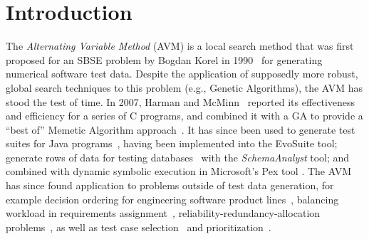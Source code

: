 \documentclass{llncs}
\newcommand{\AVM}{Alternating Variable Method\xspace}
\begin{document}
\section{Introduction}
\vspace{-1ex}
The {\it \AVM} (AVM) is a local search method that was first proposed for an SBSE problem by Bogdan Korel in 1990~\cite{Korel1990}
for generating \mbox{numerical} software test data.
Despite the application of supposedly more robust, global search techniques to this problem (e.g., Genetic Algorithms), the AVM has stood the test of time. In 2007, Harman and McMinn~\cite{Harman2007} reported its effectiveness and efficiency for a series of C programs, and combined it with a GA to provide a ``best of'' Memetic Algorithm approach~\cite{Harman2010}. It has since been used to generate test suites for Java programs~\cite{%
Fraser2015b}, having been implemented into the {\sc EvoSuite} tool; generate rows of data for testing databases~\cite{Kapfhammer2013,McMinn2015} with the {\it SchemaAnalyst} tool; and combined with dynamic symbolic execution in Microsoft's Pex tool \cite{Lakhotia2010}.
The AVM has since found application to problems outside of test data generation, for example
%
decision ordering for engineering software product lines~\cite{Yue2016}, %
%
balancing workload in requirements assignment~\cite{Yue2014}, %
%
reliability-redundancy-allocation problems~\cite{Qiu2016}, %
%
as well as test case selection~\cite{Pradhan2016} and prioritization~\cite{Arrieta2016}. %
\end{document}
